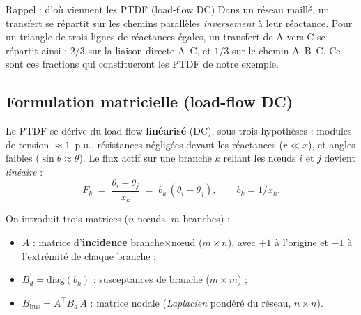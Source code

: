 \documentclass[11pt,a4paper]{article}
\begin{document}
\begin{rembox}{Rappel : d'où viennent les PTDF (load-flow DC)}
Dans un réseau maillé, un transfert se répartit sur les chemins parallèles
\emph{inversement} à leur réactance. Pour un triangle de trois lignes de
réactances égales, un transfert de A vers C se répartit ainsi :
$2/3$ sur la liaison directe A--C, et $1/3$ sur le chemin A--B--C. Ce sont
ces fractions qui constitueront les PTDF de notre exemple.
\end{rembox}

\begin{center}
\end{center}

\subsection{Formulation matricielle (load-flow DC)}
\label{sec:matrice}

Le PTDF se dérive du load-flow \textbf{linéarisé} (DC), sous trois
hypothèses : modules de tension $\approx 1$~p.u., résistances négligées
devant les réactances ($r \ll x$), et angles faibles
($\sin\theta \approx \theta$). Le flux actif sur une branche $k$ reliant
les n\oe{}uds $i$ et $j$ devient \emph{linéaire} :
\[
  F_k \;=\; \frac{\theta_i - \theta_j}{x_k}
       \;=\; b_k\,(\theta_i - \theta_j),
       \qquad b_k = 1/x_k .
\]

On introduit trois matrices ($n$ n\oe{}uds, $m$ branches) :
\begin{itemize}[nosep,leftmargin=1.4em]
  \item $A$ : matrice d'\textbf{incidence} branche$\times$n\oe{}ud
        ($m\times n$), avec $+1$ à l'origine et $-1$ à l'extrémité de
        chaque branche ;
  \item $B_d = \mathrm{diag}(b_k)$ : susceptances de branche
        ($m\times m$) ;
  \item $B_{\mathrm{bus}} = A^{\top} B_d\, A$ : matrice nodale
        (\emph{Laplacien} pondéré du réseau, $n\times n$).
\end{itemize}
\end{document}
